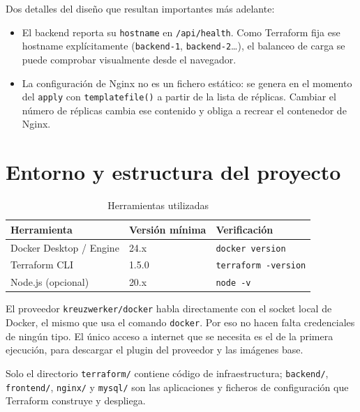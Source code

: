 \documentclass[11pt,a4paper]{article}
\begin{document}
Dos detalles del diseño que resultan importantes más adelante:

\begin{itemize}
  \item El backend reporta su \texttt{hostname} en \texttt{/api/health}.
        Como Terraform fija ese hostname explícitamente
        (\texttt{backend-1}, \texttt{backend-2}\ldots), el balanceo de
        carga se puede comprobar visualmente desde el navegador.
  \item La configuración de Nginx no es un fichero estático: se genera en
        el momento del \texttt{apply} con \texttt{templatefile()} a partir
        de la lista de réplicas. Cambiar el número de réplicas cambia ese
        contenido y obliga a recrear el contenedor de Nginx.
\end{itemize}

\section{Entorno y estructura del proyecto}

\begin{table}[H]
\centering
\caption{Herramientas utilizadas}
\begin{tabularx}{\linewidth}{@{}lYl@{}}
\toprule
\textbf{Herramienta} & \textbf{Versión mínima} & \textbf{Verificación} \\
\midrule
Docker Desktop / Engine & 24.x  & \texttt{docker version} \\
Terraform CLI           & 1.5.0 & \texttt{terraform -version} \\
Node.js (opcional)      & 20.x  & \texttt{node -v} \\
\bottomrule
\end{tabularx}
\end{table}

El proveedor \texttt{kreuzwerker/docker} habla directamente con el socket
local de Docker, el mismo que usa el comando \texttt{docker}. Por eso no
hacen falta credenciales de ningún tipo. El único acceso a internet que se
necesita es el de la primera ejecución, para descargar el plugin del
proveedor y las imágenes base.

Solo el directorio \texttt{terraform/} contiene código de infraestructura;
\texttt{backend/}, \texttt{frontend/}, \texttt{nginx/} y \texttt{mysql/}
son las aplicaciones y ficheros de configuración que Terraform construye y
despliega.
\end{document}
